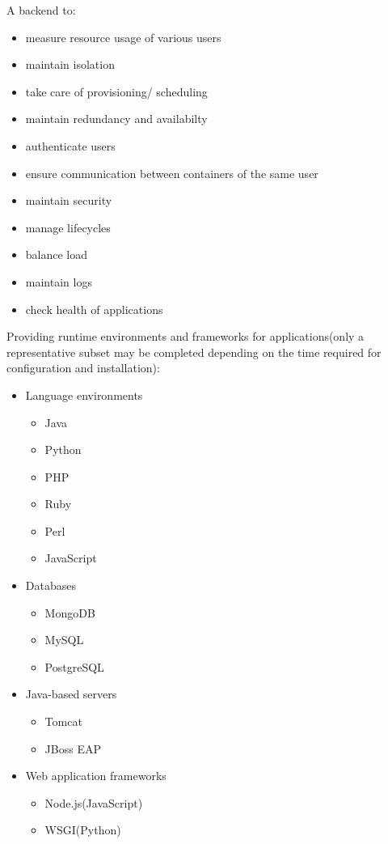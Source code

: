 \documentclass[a4paper]{article}
\begin{document}
  A backend to:
  \begin{itemize}
	  \item measure resource usage of various users
	  \item maintain isolation
	  \item take care of provisioning/ scheduling
	  \item maintain redundancy and availabilty
	  \item authenticate users
	  \item ensure communication between containers of the same user
	  \item maintain security
	  \item manage lifecycles
	  \item balance load
	  \item maintain logs
	  \item check health of applications
  \end{itemize}
  
  Providing runtime environments and frameworks for applications(only a representative subset may be completed depending on the time required for configuration and installation):
	  \begin{itemize}
		  \item Language environments
		  \begin{itemize}
			  \item Java
			  \item Python
			  \item PHP
			  \item Ruby
			  \item Perl
			  \item JavaScript
		  \end{itemize}
		  \item Databases
		  \begin{itemize}
			  \item MongoDB
			  \item MySQL
			  \item PostgreSQL
		  \end{itemize}
		  \item Java-based servers
		  \begin{itemize}
			  \item Tomcat
			  \item JBoss EAP
		  \end{itemize}
		  \item Web application frameworks
		  \begin{itemize}
			  \item Node.js(JavaScript)
			  \item WSGI(Python)
		  \end{itemize}
	  \end{itemize}
	  
\end{document}
